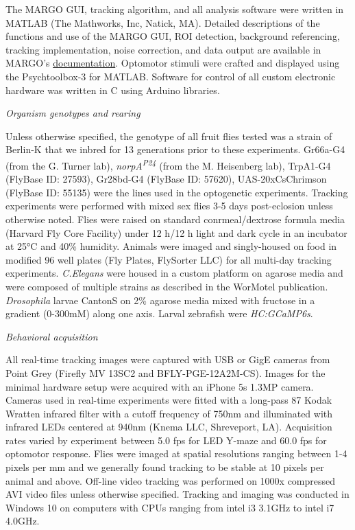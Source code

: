 \documentclass[10pt]{article}
\begin{document}
\begin{multicols}{2}
The MARGO GUI, tracking algorithm, and all analysis software were written in MATLAB (The Mathworks, Inc, Natick, MA). Detailed descriptions of the functions and use of the MARGO GUI, ROI detection, background referencing, tracking implementation, noise correction, and data output are available in MARGO's \href{https://github.com/de-Bivort-Lab/margo/wiki}{documentation}. Optomotor stimuli were crafted and displayed using the Psychtoolbox-3 for MATLAB. Software for control of all custom electronic hardware was written in C using Arduino libraries.

\vspace*{0.5cm}
\noindent\textit{Organism genotypes and rearing}
\vspace*{0.3cm}

Unless otherwise specified, the genotype of all fruit flies tested was a strain of Berlin-K that we inbred for 13 generations prior to these experiments. Gr66a-G4 (from the G. Turner lab), \textit{norpA\textsuperscript{P24}} (from the M. Heisenberg lab), TrpA1-G4 (FlyBase ID: 27593), Gr28bd-G4 (FlyBase ID: 57620), UAS-20xCsChrimson (FlyBase ID: 55135) were the lines used in the optogenetic experiments. Tracking experiments were performed with mixed sex flies 3-5 days post-eclosion unless otherwise noted. Flies were raised on standard conrmeal/dextrose formula media (Harvard Fly Core Facility) under 12 h/12 h light and dark cycle in an incubator at 25°C and 40\% humidity. Animals were imaged and singly-housed on food in modified 96 well plates (Fly Plates, FlySorter LLC) for all multi-day tracking experiments. \textit{C.Elegans} were housed in a custom platform on agarose media and were composed of multiple strains as described in the WorMotel publication\cite{Churgin_Longitudinal_2017}. \textit{Drosophila} larvae CantonS on 2\% agarose media mixed with fructose in a gradient (0-300mM) along one axis. Larval zebrafish were \textit{HC:GCaMP6s}.

\vspace*{0.5cm}
\noindent\textit{Behavioral acquisition}
\vspace*{0.3cm}

All real-time tracking images were captured with USB or GigE cameras from Point Grey (Firefly MV 13SC2 and BFLY-PGE-12A2M-CS). Images for the minimal hardware setup were acquired with an iPhone 5s 1.3MP camera. Cameras used in real-time experiments were fitted with a long-pass 87 Kodak Wratten infrared filter with a cutoff frequency of 750nm and illuminated with infrared LEDs centered at 940nm (Knema LLC, Shreveport, LA). Acquisition rates varied by experiment between 5.0 fps for LED Y-maze and 60.0 fps for optomotor response. Flies were imaged at spatial resolutions ranging between 1-4 pixels per mm and we generally found tracking to be stable at 10 pixels per animal and above. Off-line video tracking was performed on 1000x compressed AVI video files unless otherwise specified. Tracking and imaging was conducted in Windows 10 on computers with CPUs ranging from intel i3 3.1GHz to intel i7 4.0GHz. 


\end{multicols}
\end{document}
